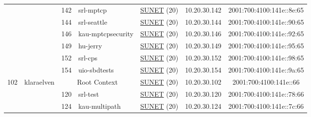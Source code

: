 \begin{small}
\begin{center}
\begin{longtable}{|c|c|c|c|c|c|c|c|}
  &  & \tiny{142} & \multicolumn{1}{|l|}{\tiny{srl-mptcp}} & \multicolumn{2}{|c|}{\tiny{\href{http://www.sunet.se}{SUNET} (20)}} & \tiny{10.20.30.142} & \tiny{2001:700:4100:141e::8e:65} \\* \cline{3-3}\cline{4-4}\cline{5-5}\cline{6-6}\cline{7-7}\cline{8-8}
  &  & \tiny{144} & \multicolumn{1}{|l|}{\tiny{srl-seattle}} & \multicolumn{2}{|c|}{\tiny{\href{http://www.sunet.se}{SUNET} (20)}} & \tiny{10.20.30.144} & \tiny{2001:700:4100:141e::90:65} \\* \cline{3-3}\cline{4-4}\cline{5-5}\cline{6-6}\cline{7-7}\cline{8-8}
  &  & \tiny{146} & \multicolumn{1}{|l|}{\tiny{kau-mptcpsecurity}} & \multicolumn{2}{|c|}{\tiny{\href{http://www.sunet.se}{SUNET} (20)}} & \tiny{10.20.30.146} & \tiny{2001:700:4100:141e::92:65} \\* \cline{3-3}\cline{4-4}\cline{5-5}\cline{6-6}\cline{7-7}\cline{8-8}
  &  & \tiny{149} & \multicolumn{1}{|l|}{\tiny{hu-jerry}} & \multicolumn{2}{|c|}{\tiny{\href{http://www.sunet.se}{SUNET} (20)}} & \tiny{10.20.30.149} & \tiny{2001:700:4100:141e::95:65} \\* \cline{3-3}\cline{4-4}\cline{5-5}\cline{6-6}\cline{7-7}\cline{8-8}
  &  & \tiny{152} & \multicolumn{1}{|l|}{\tiny{srl-cps}} & \multicolumn{2}{|c|}{\tiny{\href{http://www.sunet.se}{SUNET} (20)}} & \tiny{10.20.30.152} & \tiny{2001:700:4100:141e::98:65} \\* \cline{3-3}\cline{4-4}\cline{5-5}\cline{6-6}\cline{7-7}\cline{8-8}
  &  & \tiny{154} & \multicolumn{1}{|l|}{\tiny{uio-sbdtests}} & \multicolumn{2}{|c|}{\tiny{\href{http://www.sunet.se}{SUNET} (20)}} & \tiny{10.20.30.154} & \tiny{2001:700:4100:141e::9a:65} \\ \hline
 \multirow{10}{*}{\tiny{102}} & \multicolumn{1}{|l|}{\multirow{10}{*}{\tiny{klaraelven}}} & \multicolumn{2}{|c|}{\tiny{Root Context}} & \multicolumn{2}{|c|}{\tiny{\href{http://www.sunet.se}{SUNET} (20)}} & \tiny{10.20.30.102} & \tiny{2001:700:4100:141e::66} \\* \cline{3-3}\cline{4-4}\cline{5-5}\cline{6-6}\cline{7-7}\cline{8-8}
  &  & \tiny{120} & \multicolumn{1}{|l|}{\tiny{srl-test}} & \multicolumn{2}{|c|}{\tiny{\href{http://www.sunet.se}{SUNET} (20)}} & \tiny{10.20.30.120} & \tiny{2001:700:4100:141e::78:66} \\* \cline{3-3}\cline{4-4}\cline{5-5}\cline{6-6}\cline{7-7}\cline{8-8}
  &  & \tiny{124} & \multicolumn{1}{|l|}{\tiny{kau-multipath}} & \multicolumn{2}{|c|}{\tiny{\href{http://www.sunet.se}{SUNET} (20)}} & \tiny{10.20.30.124} & \tiny{2001:700:4100:141e::7c:66} \\* \cline{3-3}\cline{4-4}\cline{5-5}\cline{6-6}\cline{7-7}\cline{8-8}

\end{longtable}
\end{center}
\end{small}
